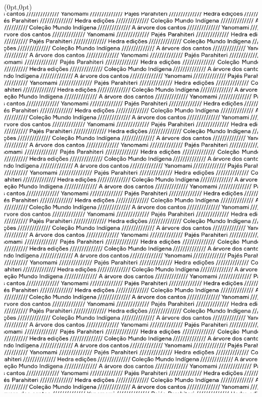 \thispagestyle{empty}

\begin{textblock*}{2.625in}(0pt,0pt)%
\vspace*{-2cm}
\hspace*{-2.65cm}\includegraphics[width=138mm]{./ABERTURA.png}  
\end{textblock*}

\pagebreak
\blankpage

\thispagestyle{empty}




